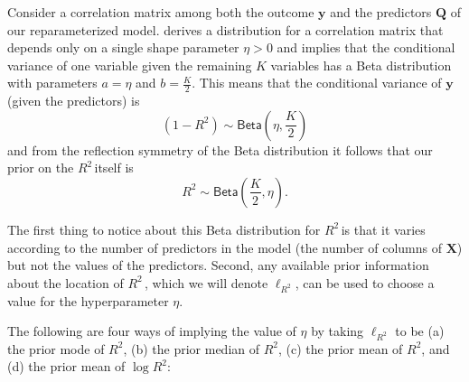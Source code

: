 \documentclass[11pt]{article}
\newcommand{\Rsq}{$R^2\,$}
\newcommand{\X}{\mathbf{X}}
\newcommand{\y}{\mathbf{y}}
\newcommand{\Q}{\mathbf{Q}}
\newcommand{\locRsq}{\ell_{R^2}}
\newcommand{\halfK}{\frac{K}{2}}
\newcommand{\Betadist}[2]{\mathsf{Beta}\left(#1,#2\right)}
\begin{document}
Consider a correlation matrix among both the outcome $\y$ and the predictors
$\Q$ of our reparameterized model.  derives a distribution for a
correlation matrix that depends only on a single shape parameter $\eta > 0$ and
implies that the conditional variance of one variable given the remaining $K$
variables has a Beta distribution with parameters $a = \eta$ and $b = \halfK$.
This means that the conditional variance of $\y$ (given the predictors) is
%
$$(1 - R^2) \sim \Betadist{\eta}{\halfK}$$
%
and from the reflection symmetry of the Beta distribution it follows that our
prior on the \Rsq itself is
%
$$R^2 \sim \Betadist{\halfK}{\eta}.$$

The first thing to notice about this Beta distribution for \Rsq is that it
varies according to the number of predictors in the model (the number of columns
of $\X$) but not the values of the predictors. Second, any available prior
information about the location of \Rsq, which we will denote $\locRsq$, can be
used to choose a value for the hyperparameter $\eta$.

The following are four ways of implying the value of $\eta$ by taking $\locRsq$
to be (a) the prior mode of $R^2$, (b) the prior median of $R^2$, (c) the prior
mean of $R^2$, and (d) the prior mean of $\log{R^2}$:
\end{document}

